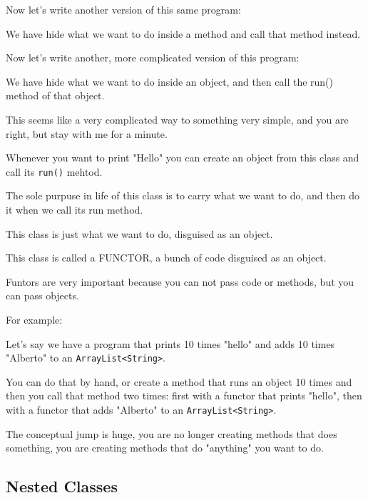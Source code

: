 \documentclass[a4paper, 9pt]{extarticle}
\begin{document}

Now let's write another version of this same program:


We have hide what we want to do inside a method and call that method instead.

Now let's write another, more complicated version of this program:

\begin{multicols}{2}
  \columnbreak
\end{multicols}

We have hide what we want to do inside an object, and then call the run()
method of that object.

This seems like a very complicated way to something very simple, and you are
right, but stay with me for a minute.

Whenever you want to print "Hello" you can create an object from this class
and call its \verb+run()+ mehtod.

The sole purpuse in life of this class is to carry what we want to do, and then
do it when we call its run method.

This class is just what we want to do, disguised as an object.

This class is called a FUNCTOR, a bunch of code disguised as an object.

Funtors are very important because you can not pass code or methods, but you can pass objects.

For example:

Let's say we have a program that prints 10 times "hello" and adds 10 times
"Alberto" to an \verb+ArrayList<String>+.

You can do that by hand, or create a method that runs an object 10 times and
then you call that method two times: first with a functor that prints "hello",
then with a functor that adds "Alberto" to an \verb+ArrayList<String>+.

The conceptual jump is huge, you are no longer creating methods that does
something, you are creating methods that do "anything" you want to do.




\subsection{Nested Classes}
\end{document}
